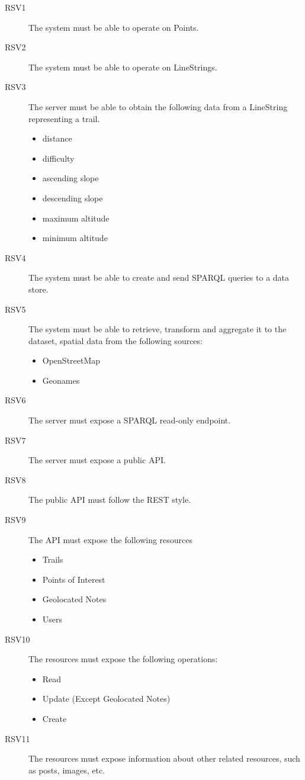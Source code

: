 \begin{description}
\item[RSV1] The system must be able to operate on Points.
\item[RSV2] The system must be able to operate on LineStrings.
\item[RSV3] The server must be able to obtain the following data from a LineString representing a trail.
 \begin{itemize}
 \item distance
 \item difficulty
 \item ascending slope
 \item descending slope
 \item maximum altitude
 \item minimum altitude
 \end{itemize}
\item[RSV4] The system must be able to create and send SPARQL queries to a data store.
\item[RSV5] The system must be able to retrieve, transform and aggregate it to the dataset, spatial data from the following sources:
  \begin{itemize}
  \item OpenStreetMap
  \item Geonames
  \end{itemize}
\item[RSV6] The server must expose a SPARQL read-only endpoint.
\item[RSV7] The server must expose a public API.
\item[RSV8] The public API must follow the REST style.
\item[RSV9] The API must expose the following resources
  \begin{itemize}
  \item Trails
  \item Points of Interest
  \item Geolocated Notes
  \item Users
  \end{itemize}
\item[RSV10] The resources must expose the following operations:
  \begin{itemize}
  \item Read
  \item Update (Except Geolocated Notes)
  \item Create
  \end{itemize}
\item[RSV11] The resources must expose information about other related resources, such as posts, images, etc.

\end{description}
